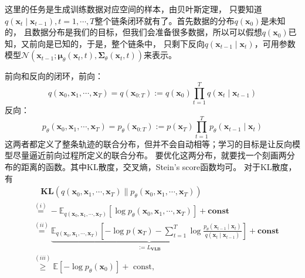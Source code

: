 这里的任务是生成训练数据对应空间的样本，由贝叶斯定理，
只要知道$q(\mathbf{x}_t \mid \mathbf{x}_{t-1}), t=1,\cdots, T$整个链条闭环就有了。首先数据的分布$q(\mathbf{x}_0)$是未知的，
且数据分布是我们的目标，但我们会准备很多数据，所以可以假想$q(\mathbf{x}_0)$已知，又前向是已知的，于是，整个链条中，
只剩下反向$q(\mathbf{x}_{t-1} \mid \mathbf{x}_t)$，可用参数模型$\mathcal{N}\left(\mathbf{x}_{t-1} ;
 \boldsymbol{\mu}_\theta\left(\mathbf{x}_t, t\right), \boldsymbol{\Sigma}_\theta\left(\mathbf{x}_t, t\right)\right)$来表示。

前向和反向的闭环，前向：
\begin{equation}
q\left(\mathbf{x}_0, \mathbf{x}_1, \cdots, \mathbf{x}_T\right)=q(\mathbf{x}_{0:T}):=q\left(\mathbf{x}_0\right) \prod_{t=1}^T q\left(\mathbf{x}_t \mid \mathbf{x}_{t-1}\right)
\end{equation}
反向：
\begin{equation}
p_\theta\left(\mathbf{x}_0, \mathbf{x}_1, \cdots, \mathbf{x}_T\right)=p_\theta(\mathbf{x}_{0:T}):=p\left(\mathbf{x}_T\right) \prod_{t=1}^T p_\theta\left(\mathbf{x}_{t-1} \mid \mathbf{x}_t\right)
\end{equation}
这两者都定义了整条轨迹的联合分布，但并不会自动相等；学习的目标是让反向模型尽量逼近前向过程所定义的联合分布。
要优化这两分布，就要找一个刻画两分布的距离的函数。其中KL散度，交叉熵，Stein's score函数均可。
对于KL散度，有
\begin{equation}
\label{orig:path-kl}
\begin{aligned}
& \quad \mathbf{KL}\left(q\left(\mathbf{x}_0, \mathbf{x}_1, \cdots, \mathbf{x}_T\right) \| p_\theta\left(\mathbf{x}_0, \mathbf{x}_1, \cdots, \mathbf{x}_T\right)\right) \\
& \stackrel{(i)}{=}-\mathbb{E}_{q\left(\mathbf{x}_0, \mathbf{x}_1, \cdots, \mathbf{x}_T\right)}\left[\log p_\theta\left(\mathbf{x}_0, \mathbf{x}_1, \cdots, \mathbf{x}_T\right)\right]+\mathbf{const} \\
& \stackrel{(i i)}{=} \underbrace{\mathbb{E}_{q\left(\mathbf{x}_0, \mathbf{x}_1, \cdots, \mathbf{x}_T\right)}\left[-\log p\left(\mathbf{x}_T\right)-\sum_{t=1}^T \log \frac{p_\theta\left(\mathbf{x}_{t-1} \mid \mathbf{x}_t\right)}{q\left(\mathbf{x}_t \mid \mathbf{x}_{t-1}\right)}\right]}_{:=L_{\mathbf{VLB}}}+\mathbf{const} \\
& \stackrel{(i i i)}{\geq} \mathbb{E}\left[-\log p_\theta\left(\mathbf{x}_0\right)\right]+\text { const, }
\end{aligned}
\end{equation}

